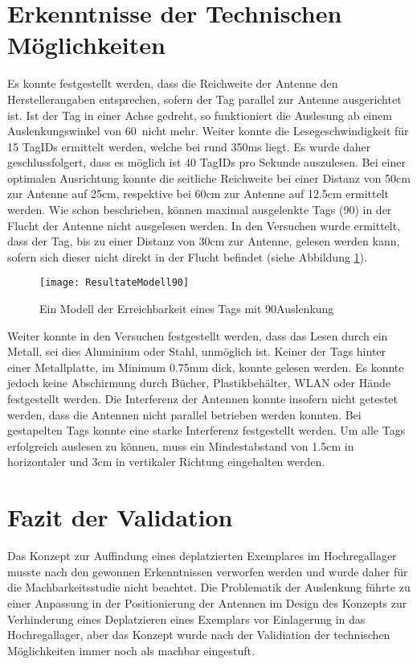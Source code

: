 \section{Erkenntnisse der Technischen Möglichkeiten}
Es konnte festgestellt werden, dass die Reichweite der Antenne den Herstellerangaben entsprechen, sofern der Tag parallel zur Antenne ausgerichtet ist. Ist der Tag in einer Achse gedreht, so funktioniert die Auslesung ab einem Auslenkungswinkel von 60\SIUnitSymbolDegree\ nicht mehr. Weiter konnte die Lesegeschwindigkeit für 15 TagIDs ermittelt werden, welche bei rund 350ms liegt. Es wurde daher geschlussfolgert, dass es möglich ist 40 TagIDs pro Sekunde auszulesen.
Bei einer optimalen Ausrichtung konnte die seitliche Reichweite bei einer Distanz von 50cm zur Antenne auf 25cm, respektive bei 60cm zur Antenne auf 12.5cm ermittelt werden. Wie schon beschrieben, können maximal ausgelenkte Tags (90\SIUnitSymbolDegree) in der Flucht der Antenne nicht ausgelesen werden. In den Versuchen wurde ermittelt, dass der Tag, bis zu einer Distanz von 30cm zur Antenne, gelesen werden kann, sofern sich dieser nicht direkt in der Flucht befindet (siehe Abbildung \ref{fig:Seitlich90}).

\begin{figure}[htb]
	\centering
	\texttt{[image: ResultateModell90]}
	\caption{Ein Modell der Erreichbarkeit eines Tags mit 90\SIUnitSymbolDegree Auslenkung}
	\label{fig:Seitlich90}
\end{figure}

Weiter konnte in den Versuchen festgestellt werden, dass das Lesen durch ein Metall, sei dies Aluminium oder Stahl, unmöglich ist. Keiner der Tags hinter einer Metallplatte, im Minimum 0.75mm dick, konnte gelesen werden. Es konnte jedoch keine Abschirmung durch Bücher, Plastikbehälter, WLAN oder Hände festgestellt werden. Die Interferenz der Antennen konnte insofern nicht getestet werden, dass die Antennen nicht parallel betrieben werden konnten. Bei gestapelten Tags konnte eine starke Interferenz festgestellt werden. Um alle Tags erfolgreich auslesen zu können, muss ein Mindestabstand von 1.5cm in horizontaler und 3cm in vertikaler Richtung eingehalten werden.

\section{Fazit der Validation}
Das Konzept zur Auffindung eines deplatzierten Exemplares im Hochregallager musste nach den gewonnen Erkenntnissen verworfen werden und wurde daher für die Machbarkeitsstudie nicht beachtet. Die Problematik der Auslenkung führte zu einer Anpassung in der Positionierung der Antennen im Design des Konzepts zur Verhinderung eines Deplatzieren eines Exemplars vor Einlagerung in das Hochregallager, aber das Konzept wurde nach der Validiation der technischen Möglichkeiten immer noch als machbar eingestuft.